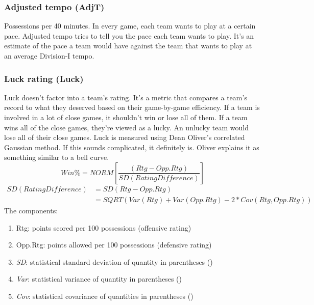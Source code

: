 \documentclass[
10pt, %
a4paper, %
oneside, %
headinclude,footinclude, %
BCOR5mm, %
]{scrartcl}
\begin{document}
\subsubsection{Adjusted tempo (AdjT)}
Possessions per 40 minutes. In every game, each team wants to play at a certain pace. Adjusted tempo tries to tell you the pace each team wants to play. It's an estimate of the pace a team would have against the team that wants to play at an average Division-I tempo.

\subsubsection{Luck rating (Luck)}
Luck doesn't factor into a team's rating. It's a metric that compares a team's record to what they deserved based on their game-by-game efficiency.
If a team is involved in a lot of close games, it shouldn't win or lose all of them. If a team wins all of the close games, they're viewed as a lucky. An unlucky team would lose all of their close games.
Luck is measured using Dean Oliver's correlated Gaussian method.
If this sounds complicated, it definitely is.
Oliver explains it as something similar to a bell curve.
\begin{equation}
Win\% = \mathit{NORM}\left [ \frac{\left (Rtg-Opp.Rtg \right )}{\mathit{SD}\left ( Rating Difference \right )} \right ]
\end{equation}
\begin{equation}
\begin{split}
\mathit{SD}\left(Rating Difference\right) & = \mathit{SD}\left(Rtg - Opp.Rtg\right)  \\
							& = \mathit{SQRT}\left(\mathit{Var}\left(Rtg\right)+\mathit{Var}\left(Opp.Rtg\right) - 2*\mathit{Cov}\left(Rtg,Opp.Rtg\right)\right)
\end{split}
\end{equation}
The components:
\begin{enumerate}
\item Rtg: points scored per 100 possessions (offensive rating)
\item Opp.Rtg: points allowed per 100 possessions (defensive rating)
\item \textit{SD}: statistical standard deviation of quantity in parentheses ()
\item \textit{Var}: statistical variance of quantity in parentheses ()
\item \textit{Cov}: statistical covariance of quantities in parentheses ()
\end{enumerate}
\end{document}
